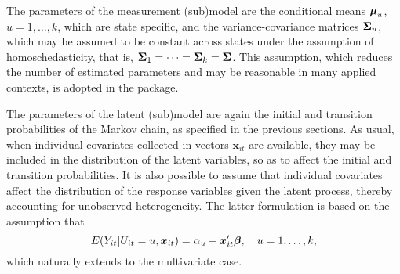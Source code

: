 The parameters of the measurement (sub)model are the conditional means
\(\mbox{\boldmath $\mu$}_u\), \(u=1,\ldots,k\), which are state specific, and the
variance-covariance matrices \(\mbox{\boldmath $\Sigma$}_u\), which may be assumed to be
constant across states under the assumption of homoschedasticity, that
is, \(\mbox{\boldmath $\Sigma$}_1 = \cdots = \mbox{\boldmath $\Sigma$}_k = \mbox{\boldmath $\Sigma$}\). This
assumption, which reduces the number of estimated parameters and may be
reasonable in many applied contexts, is adopted in the 
package.

The parameters of the latent (sub)model are again the initial and
transition probabilities of the Markov chain, as specified in the
previous sections. As usual, when individual covariates collected in
vectors \(\mathbf{x}_{it}\) are available, they may be included in the
distribution of the latent variables, so as to affect the initial and
transition probabilities. It is also possible to assume that individual
covariates affect the distribution of the response variables given the
latent process, thereby accounting for unobserved heterogeneity. The
latter formulation is based on the assumption that \[
E(Y_{it}| U_{it} = u, \mbox{\boldmath $x$}_{it}) =  {\alpha}_{u} + \mbox{\boldmath $x$}_{it}^\prime \mbox{\boldmath $\beta$},\quad u=1,\ldots,k,
\] which naturally extends to the multivariate case.

